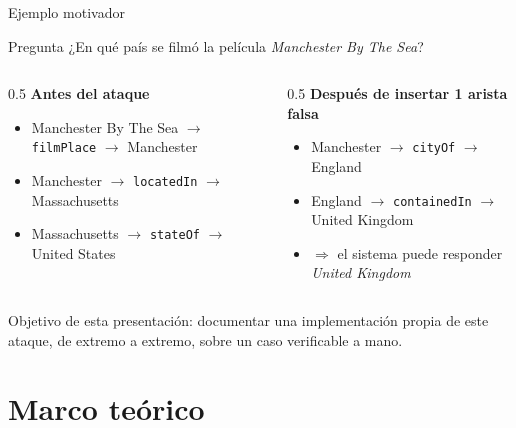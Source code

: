 \documentclass[aspectratio=169]{beamer}
\begin{document}
\begin{frame}{Ejemplo motivador}
  \begin{block}{Pregunta}
    ¿En qué país se filmó la película \emph{Manchester By The Sea}?
  \end{block}
  \begin{columns}
    \begin{column}{0.5\textwidth}
      \textbf{Antes del ataque}
      \begin{itemize}
        \item[] Manchester By The Sea \(\to\) \texttt{filmPlace} \(\to\) Manchester
        \item[] Manchester \(\to\) \texttt{locatedIn} \(\to\) Massachusetts
        \item[] Massachusetts \(\to\) \texttt{stateOf} \(\to\) United States
      \end{itemize}
    \end{column}
    \begin{column}{0.5\textwidth}
      \textbf{Después de insertar 1 arista falsa}
      \begin{itemize}
        \item[] Manchester \(\to\) \texttt{cityOf} \(\to\) England
        \item[] England \(\to\) \texttt{containedIn} \(\to\) United Kingdom
        \item[] $\Rightarrow$ el sistema puede responder \emph{United Kingdom}
      \end{itemize}
    \end{column}
  \end{columns}
  \vspace{0.5em}
  \small Objetivo de esta presentación: documentar una implementación propia de
  este ataque, de extremo a extremo, sobre un caso verificable a mano.
\end{frame}

\section{Marco teórico}
\end{document}
